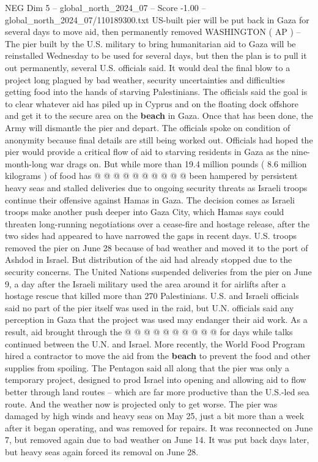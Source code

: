 \begin{textsample}{NEG Dim 5 – global\_north\_2024\_07 – Score -1.00 – global\_north\_2024\_07/110189300.txt}  \label{ex:f5_neg_154}
US-built pier will be put back in Gaza for several days to move aid, then permanently removed WASHINGTON ( AP ) -- The pier built by the U.S. military to bring humanitarian aid to Gaza will be reinstalled Wednesday to be used for several days, but then the plan is to pull it out permanently, several U.S. officials said.
It would deal the final blow to a project long plagued by bad weather, security uncertainties and difficulties getting food into the hands of starving Palestinians.
The officials said the goal is to clear whatever aid has piled up in Cyprus and on the floating dock offshore and get it to the secure area on the \textbf{beach} in Gaza.
Once that has been done, the Army will dismantle the pier and depart.
The officials spoke on condition of anonymity because final details are still being worked out.
Officials had hoped the pier would provide a critical flow of aid to starving residents in Gaza as the nine-month-long war drags on.
But while more than 19.4 million pounds ( 8.6 million kilograms ) of food has @ @ @ @ @ @ @ @ @ @ been hampered by persistent heavy seas and stalled deliveries due to ongoing security threats as Israeli troops continue their offensive against Hamas in Gaza.
The decision comes as Israeli troops make another push deeper into Gaza City, which Hamas says could threaten long-running negotiations over a cease-fire and hostage release, after the two sides had appeared to have narrowed the gaps in recent days.
U.S. troops removed the pier on June 28 because of bad weather and moved it to the port of Ashdod in Israel.
But distribution of the aid had already stopped due to the security concerns.
The United Nations suspended deliveries from the pier on June 9, a day after the Israeli military used the area around it for airlifts after a hostage rescue that killed more than 270 Palestinians.
U.S. and Israeli officials said no part of the pier itself was used in the raid, but U.N. officials said any perception in Gaza that the project was used may endanger their aid work.
As a result, aid brought through the @ @ @ @ @ @ @ @ @ @ for days while talks continued between the U.N. and Israel.
More recently, the World Food Program hired a contractor to move the aid from the \textbf{beach} to prevent the food and other supplies from spoiling.
The Pentagon said all along that the pier was only a temporary project, designed to prod Israel into opening and allowing aid to flow better through land routes -- which are far more productive than the U.S.-led sea route.
And the weather now is projected only to get worse.
The pier was damaged by high winds and heavy seas on May 25, just a bit more than a week after it began operating, and was removed for repairs.
It was reconnected on June 7, but removed again due to bad weather on June 14.
It was put back days later, but heavy seas again forced its removal on June 28.

\end{textsample}
